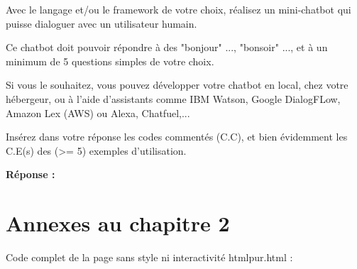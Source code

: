 \documentclass[11pt]{article}
\begin{document}
Avec le langage et/ou le framework de votre choix, réalisez un mini-chatbot qui puisse dialoguer avec un utilisateur humain.

Ce chatbot doit pouvoir répondre à des "bonjour" ..., "bonsoir" ..., et à un minimum de 5 questions simples de votre choix.

Si vous le souhaitez, vous pouvez développer votre chatbot en local, chez votre hébergeur, ou à l’aide d’assistants comme IBM
Watson, Google DialogFLow, Amazon Lex (AWS) ou Alexa, Chatfuel,...

Insérez dans votre réponse les codes commentés (C.C), et bien évidemment les C.E(s) des (>= 5) exemples d’utilisation.

\textbf{Réponse :}

\newpage

\appendix
\section{Annexes au chapitre 2}

Code complet de la page sans style ni interactivité htmlpur.html :

\smallskip
\end{document}
